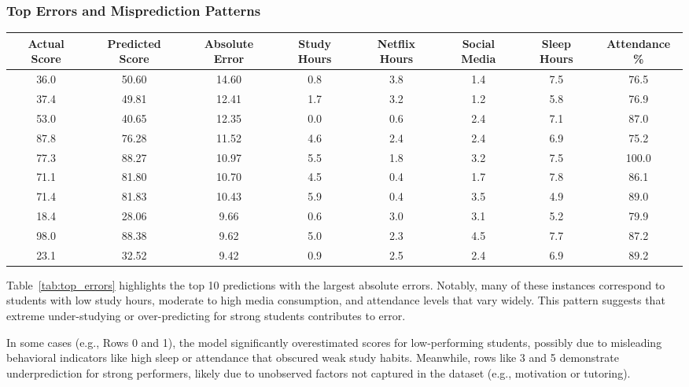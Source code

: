 \documentclass[conference]{IEEEtran}
\begin{document}
\subsubsection*{Top Errors and Misprediction Patterns}
\begin{table*}[htbp]
  \caption{Top 10 Lasso Prediction Errors and Associated Features}
  \label{tab:top_errors}
  \centering
  \begin{tabular}{|c|c|c|c|c|c|c|c|}
    \hline
    \textbf{Actual Score} & \textbf{Predicted Score} & \textbf{Absolute Error} & \textbf{Study Hours} & \textbf{Netflix Hours} & \textbf{Social Media} & \textbf{Sleep Hours} & \textbf{Attendance \%} \\
    \hline
    36.0  & 50.60 & 14.60 & 0.8 & 3.8 & 1.4 & 7.5 & 76.5 \\
    37.4  & 49.81 & 12.41 & 1.7 & 3.2 & 1.2 & 5.8 & 76.9 \\
    53.0  & 40.65 & 12.35 & 0.0 & 0.6 & 2.4 & 7.1 & 87.0 \\
    87.8  & 76.28 & 11.52 & 4.6 & 2.4 & 2.4 & 6.9 & 75.2 \\
    77.3  & 88.27 & 10.97 & 5.5 & 1.8 & 3.2 & 7.5 & 100.0 \\
    71.1  & 81.80 & 10.70 & 4.5 & 0.4 & 1.7 & 7.8 & 86.1 \\
    71.4  & 81.83 & 10.43 & 5.9 & 0.4 & 3.5 & 4.9 & 89.0 \\
    18.4  & 28.06 & 9.66  & 0.6 & 3.0 & 3.1 & 5.2 & 79.9 \\
    98.0  & 88.38 & 9.62  & 5.0 & 2.3 & 4.5 & 7.7 & 87.2 \\
    23.1  & 32.52 & 9.42  & 0.9 & 2.5 & 2.4 & 6.9 & 89.2 \\
    \hline
  \end{tabular}
\end{table*}

Table~\ref{tab:top_errors} highlights the top 10 predictions with the largest absolute errors. Notably, many of these instances correspond to students with low study hours, moderate to high media consumption, and attendance levels that vary widely. This pattern suggests that extreme under-studying or over-predicting for strong students contributes to error.

In some cases (e.g., Rows 0 and 1), the model significantly overestimated scores for low-performing students, possibly due to misleading behavioral indicators like high sleep or attendance that obscured weak study habits. Meanwhile, rows like 3 and 5 demonstrate underprediction for strong performers, likely due to unobserved factors not captured in the dataset (e.g., motivation or tutoring).
\end{document}
